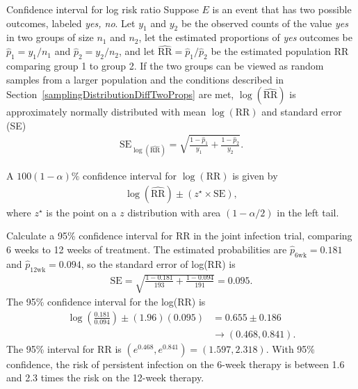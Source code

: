 \begin{onebox}{Confidence interval for log risk ratio}
  Suppose $E$ is an event that has two possible outcomes, labeled \textit{yes, no}. Let $y_1$ and $y_2$ be the observed counts of the value \textit{yes} in two groups of size $n_1$ and $n_2$, let the estimated proportions of \textit{yes} outcomes be $\hat{p}_1 = y_1/n_1$ and $\hat{p}_2 = y_2/n_2$, and let $\widehat{\text{RR}} = \hat{p}_1/\hat{p}_2$ be the estimated population RR comparing group 1 to group 2.  If the two groups can be viewed as random samples from a larger population and the conditions described in Section~\ref{samplingDistributionDiffTwoProps} are met,  $\log(\widehat{\text{RR}})$ is approximately normally distributed with mean  $\log(\text{RR})$ and standard error (SE)
  \begin{align*}
  \text{SE}_{\log(\widehat{\text{RR}})} = \sqrt{\frac{1 - \hat{p}_1}{y_1} + \frac{1 - \hat{p}_2}{y_2}}.
  \end{align*}

  A $100(1  - \alpha)\%$ confidence interval for $\log(\text{RR})$ is given by
\begin{align}
  \log(\widehat{\text{RR}}) \pm (z^{\star} \times \text{SE}),
  \label{eqn:confidenceIntervalRR}
\end{align}
where $z^{\star}$ is the point on a $z$  distribution with area $(1 - \alpha/2)$ in the left tail.
\end{onebox}

\begin{examplewrap}
\begin{nexample}{Calculate a 95\% confidence interval for RR in the joint infection trial, comparing 6 weeks to 12 weeks of treatment.}\label{ex:jointInfectionRRCI}
The estimated probabilities are $\hat{p}_{\text{6wk}} = 0.181$ and
$\hat{p}_{\text{12wk}} = 0.094$, so the standard error of log(RR) is
\begin{align*}
    \text{SE} = \sqrt{\frac{1 - 0.181}{193} + \frac{1 - 0.094}{191}} = 0.095.
  \end{align*}
The 95\% confidence interval for the log(RR) is
\begin{align*}
\log\left(\frac{0.181}{0.094}\right) \pm (1.96)(0.095) &= 0.655 \pm 0.186\\
&\to (0.468, 0.841).
\end{align*}
The 95\% interval for RR is $(e^{0.468}, e^{0.841}) = (1.597, 2.318)$. With 95\% confidence, the risk of persistent infection on the 6-week therapy is between 1.6 and 2.3 times the risk on the 12-week therapy.
\end{nexample}
\end{examplewrap}

